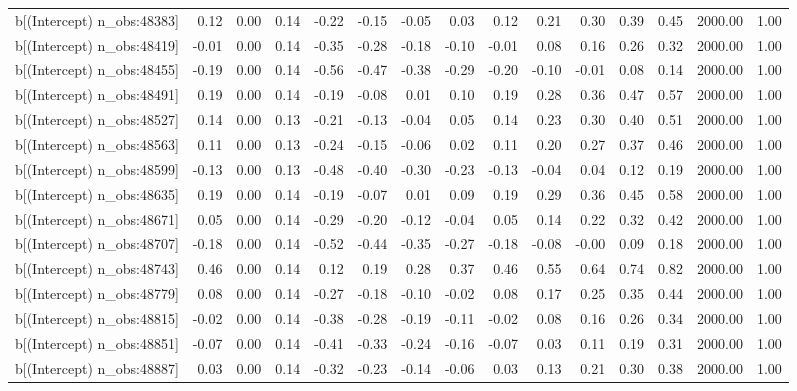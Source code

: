 \begin{table}[ht]
\begin{tabular}{rrrrrrrrrrrrrrr}
  b[(Intercept) n\_obs:48383] & 0.12 & 0.00 & 0.14 & -0.22 & -0.15 & -0.05 & 0.03 & 0.12 & 0.21 & 0.30 & 0.39 & 0.45 & 2000.00 & 1.00 \\ 
  b[(Intercept) n\_obs:48419] & -0.01 & 0.00 & 0.14 & -0.35 & -0.28 & -0.18 & -0.10 & -0.01 & 0.08 & 0.16 & 0.26 & 0.32 & 2000.00 & 1.00 \\ 
  b[(Intercept) n\_obs:48455] & -0.19 & 0.00 & 0.14 & -0.56 & -0.47 & -0.38 & -0.29 & -0.20 & -0.10 & -0.01 & 0.08 & 0.14 & 2000.00 & 1.00 \\ 
  b[(Intercept) n\_obs:48491] & 0.19 & 0.00 & 0.14 & -0.19 & -0.08 & 0.01 & 0.10 & 0.19 & 0.28 & 0.36 & 0.47 & 0.57 & 2000.00 & 1.00 \\ 
  b[(Intercept) n\_obs:48527] & 0.14 & 0.00 & 0.13 & -0.21 & -0.13 & -0.04 & 0.05 & 0.14 & 0.23 & 0.30 & 0.40 & 0.51 & 2000.00 & 1.00 \\ 
  b[(Intercept) n\_obs:48563] & 0.11 & 0.00 & 0.13 & -0.24 & -0.15 & -0.06 & 0.02 & 0.11 & 0.20 & 0.27 & 0.37 & 0.46 & 2000.00 & 1.00 \\ 
  b[(Intercept) n\_obs:48599] & -0.13 & 0.00 & 0.13 & -0.48 & -0.40 & -0.30 & -0.23 & -0.13 & -0.04 & 0.04 & 0.12 & 0.19 & 2000.00 & 1.00 \\ 
  b[(Intercept) n\_obs:48635] & 0.19 & 0.00 & 0.14 & -0.19 & -0.07 & 0.01 & 0.09 & 0.19 & 0.29 & 0.36 & 0.45 & 0.58 & 2000.00 & 1.00 \\ 
  b[(Intercept) n\_obs:48671] & 0.05 & 0.00 & 0.14 & -0.29 & -0.20 & -0.12 & -0.04 & 0.05 & 0.14 & 0.22 & 0.32 & 0.42 & 2000.00 & 1.00 \\ 
  b[(Intercept) n\_obs:48707] & -0.18 & 0.00 & 0.14 & -0.52 & -0.44 & -0.35 & -0.27 & -0.18 & -0.08 & -0.00 & 0.09 & 0.18 & 2000.00 & 1.00 \\ 
  b[(Intercept) n\_obs:48743] & 0.46 & 0.00 & 0.14 & 0.12 & 0.19 & 0.28 & 0.37 & 0.46 & 0.55 & 0.64 & 0.74 & 0.82 & 2000.00 & 1.00 \\ 
  b[(Intercept) n\_obs:48779] & 0.08 & 0.00 & 0.14 & -0.27 & -0.18 & -0.10 & -0.02 & 0.08 & 0.17 & 0.25 & 0.35 & 0.44 & 2000.00 & 1.00 \\ 
  b[(Intercept) n\_obs:48815] & -0.02 & 0.00 & 0.14 & -0.38 & -0.28 & -0.19 & -0.11 & -0.02 & 0.08 & 0.16 & 0.26 & 0.34 & 2000.00 & 1.00 \\ 
  b[(Intercept) n\_obs:48851] & -0.07 & 0.00 & 0.14 & -0.41 & -0.33 & -0.24 & -0.16 & -0.07 & 0.03 & 0.11 & 0.19 & 0.31 & 2000.00 & 1.00 \\ 
  b[(Intercept) n\_obs:48887] & 0.03 & 0.00 & 0.14 & -0.32 & -0.23 & -0.14 & -0.06 & 0.03 & 0.13 & 0.21 & 0.30 & 0.38 & 2000.00 & 1.00 \\ 

\end{tabular}
\end{table}
